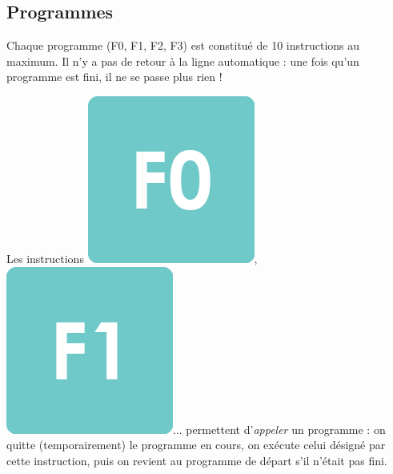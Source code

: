 \documentclass[a4paper]{article}
\begin{document}
\begin{minipage}{6cm}
\vspace{-2mm}

\subsection*{Programmes}

\vspace{-0.2cm}

Chaque programme (F0, F1, F2, F3) est constitué de 10 instructions au
maximum.
Il n'y a pas de \og retour à la ligne \fg{} automatique : une fois
qu'un programme est fini, il ne se passe plus rien !



Les instructions \includegraphics[height=\baselineskip]{f0},
  \includegraphics[height=\baselineskip]{f1}... permettent
d'\emph{appeler} un programme : on quitte (temporairement) le programme
en cours, on exécute celui désigné par cette instruction, puis on
revient au programme de départ s'il n'était pas fini.

\vspace{-0.2cm}


\end{minipage}
\end{document}
